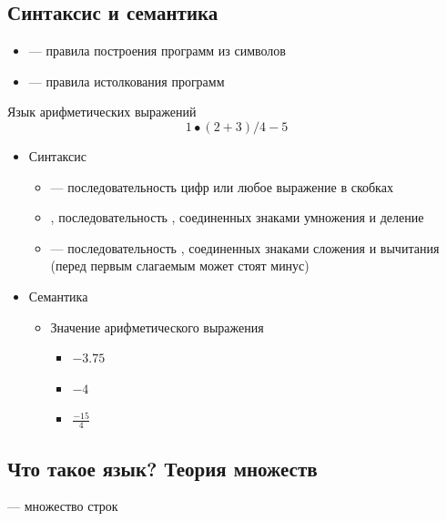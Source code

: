 \documentclass[a4paper, 14pt]{extarticle}
\begin{document}
\subsection{Синтаксис и семантика}
\begin{itemize}
    \item {} --- правила построения программ из символов
    \item {} --- правила истолкования программ
\end{itemize}
\begin{example}{Язык арифметических выражений}
    \[ 1 \bullet (2+3) / 4 - 5 \]
    \begin{itemize}
        \item Синтаксис
        \begin{itemize}
            \item {} --- последовательность цифр или любое выражение в скобках
            \item {}, последовательность , соединенных знаками умножения и деление
            \item {} --- последовательность , соединенных знаками сложения и вычитания (перед первым слагаемым может стоят минус)  
        \end{itemize}
        \item Семантика
        \begin{itemize}
            \item Значение арифметического выражения 
            \begin{itemize}
                \item $-3.75$
                \item $-4$
                \item $ \frac{-15}{4} $
            \end{itemize}
        \end{itemize}
    \end{itemize}
\end{example}

\subsection{Что такое язык? Теория множеств}
 --- множество строк
\end{document}
